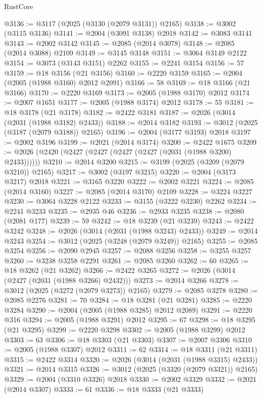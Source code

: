 \begin{lexlean}{RustCore}
\begin{coremodule}
@3136 := @3117 (@2025 (@3130 (@2079 @3131)) @2165)
@3138 := @3002 (@3115 @3136)
@3141 := @2004 (@3091 @3138) @2018
@3142 := @3083 @3141
@3143 := @2002 @3142
@3145 := @2085 (@2014 @3078)
@3148 := @2085 (@2014 @3088) @2109
@3149 := @3145 @3148
@3151 := @3064 @3149 @2122
@3154 := @3073 (@3143 @3151) @2262
@3155 := @2241 @3154
@3156 := 57
@3159 := @18 @3156 (@21 @3156)
@3160 := @2220 @3159
@3165 := @2004 (@2005 (@1988 @3160) @2012 @2091)
@3166 := 58
@3169 := @18 @3166 (@21 @3166)
@3170 := @2220 @3169
@3173 := @2005 (@1988 @3170) @2012
@3174 := @2007 @1651
@3177 := @2005 (@1988 @3174) @2012
@3178 := 55
@3181 := @18 @3178 (@21 @3178)
@3182 := @2422 @3181
@3187 := @2026 (@3014 (@2031 (@1988 @3182) @2433))
@3188 := @2014 @3182
@3193 := @3012 (@2025 (@3187 (@2079 @3188)) @2165)
@3196 := @2004 (@3177 @3193) @2018
@3197 := @2002 @3196
@3199 := @2021 (@2014 @3174)
@3200 := @2422 @1675
@3209 := @2026 (@2420 (@2427 (@2427 (@2427 (@2427 (@2031 (@1988 @3200) @2433))))))
@3210 := @2014 @3200
@3215 := @3199 (@2025 (@3209 (@2079 @3210)) @2165)
@3217 := @3002 (@3197 @3215)
@3220 := @2004 (@3173 @3217) @2018
@3221 := @3165 @3220
@3222 := @2002 @3221
@3224 := @2085 (@2014 @3160)
@3227 := @2085 (@2014 @3170) @2109
@3228 := @3224 @3227
@3230 := @3064 @3228 @2122
@3233 := @3155 (@3222 @3230) @2262
@3234 := @2241 @3233
@3235 := @2935 @46
@3236 := @2933 @3235
@3238 := @2080 (@2081 @177)
@3239 := 59
@3242 := @18 @3239 (@21 @3239)
@3243 := @2422 @3242
@3248 := @2026 (@3014 (@2031 (@1988 @3243) @2433))
@3249 := @2014 @3243
@3254 := @3012 (@2025 (@3248 (@2079 @3249)) @2165)
@3255 := @2085 @3254
@3256 := @2090 @2945
@3257 := @2088 @3256
@3258 := @3255 @3257
@3260 := @3238 @3258 @2291
@3261 := @2085 @3260
@3262 := 60
@3265 := @18 @3262 (@21 @3262)
@3266 := @2422 @3265
@3272 := @2026 (@3014 (@2427 (@2031 (@1988 @3266) @2432)))
@3273 := @2014 @3266
@3278 := @3012 (@2025 (@3272 (@2079 @3273)) @2165)
@3279 := @2085 @3278
@3280 := @2085 @2276
@3281 := 70
@3284 := @18 @3281 (@21 @3281)
@3285 := @2220 @3284
@3290 := @2004 (@2005 (@1988 @3285) @2012 @2089)
@3291 := @2220 @316
@3294 := @2005 (@1988 @3291) @2012
@3295 := 67
@3298 := @18 @3295 (@21 @3295)
@3299 := @2220 @3298
@3302 := @2005 (@1988 @3299) @2012
@3303 := 63
@3306 := @18 @3303 (@21 @3303)
@3307 := @2007 @3306
@3310 := @2005 (@1988 @3307) @2012
@3311 := 62
@3314 := @18 @3311 (@21 @3311)
@3315 := @2422 @3314
@3320 := @2026 (@3014 (@2031 (@1988 @3315) @2433))
@3321 := @2014 @3315
@3326 := @3012 (@2025 (@3320 (@2079 @3321)) @2165)
@3329 := @2004 (@3310 @3326) @2018
@3330 := @2002 @3329
@3332 := @2021 (@2014 @3307)
@3333 := 61
@3336 := @18 @3333 (@21 @3333)

\end{coremodule}
\end{lexlean}
